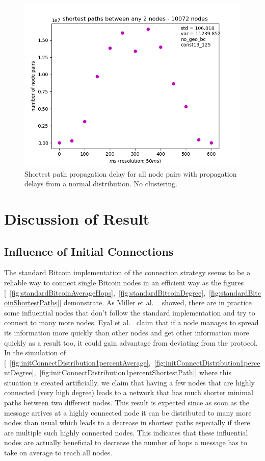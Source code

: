 \documentclass[a4paper, oneside]{discothesis}
\begin{document}
\begin{figure}
    \centering
    \includegraphics[width=.8\columnwidth]{figures/geoCluster/const13_125/noGeo/final-shortest-paths-between-any-nodes-10072-nodes.png}
    \caption{Shortest path propagation delay for all node pairs with propagation delays from a normal distribution. No clustering.}
    \label{fig:geoCluster-const13_125-noGeo-shortest-path}
\end{figure}

\chapter{Discussion of Result}

\section{Influence of Initial Connections}

The standard Bitcoin implementation of the connection strategy seems to be a reliable way to connect single Bitcoin nodes in an efficient way as the figures [~\ref{fig:standardBitcoinAverageHops},~\ref{fig:standardBitcoinDegree},~\ref{fig:standardBitcoinShortestPaths}] demonstrate.
As Miller et al. ~\cite{DiscoveringBitcoinsPublicTopologyAndInfluentialNodes} showed, there are in practice some influential nodes that don't follow the standard implementation and try to connect to many more nodes. Eyal et al.~\cite{MajorityIsNotEnough} claim that if a node manages to spread its information more quickly than other nodes and get other information more quickly as a result too, it could gain advantage from deviating from the protocol.
In the simulation of [~\ref{fig:initConnectDistribution1percentAverage},~\ref{fig:initConnectDistribution1percentDegree},~\ref{fig:initConnectDistribution1percentShortestPath}] where this situation is created artificially, we claim that having a few nodes that are highly connected (very high degree) leads to a network that has much shorter minimal paths between two different nodes. This result is expected since as soon as the message arrives at a highly connected node it can be distributed to many more nodes than usual which leads to a decrease in shortest paths especially if there are multiple such highly connected nodes.
This indicates that these influential nodes are actually beneficial to decrease the number of hops a message has to take on average to reach all nodes.
\end{document}
